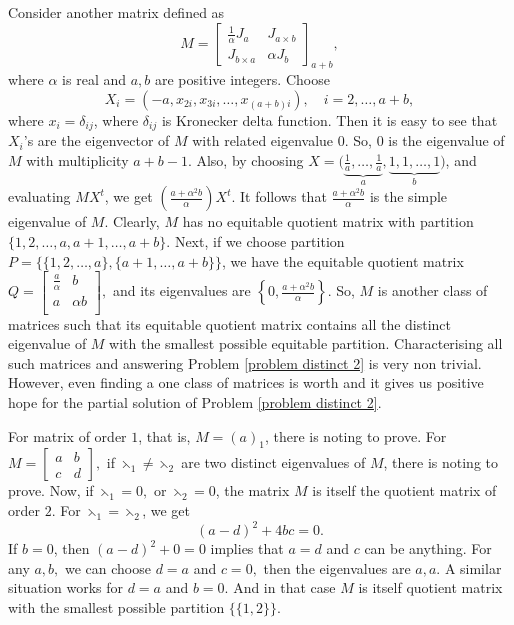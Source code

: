 \documentclass[12pt,twoside]{article}
\begin{document}
Consider another matrix defined as
$$M=\begin{bmatrix}
	\frac{1}{\alpha}J_{a} & J_{a\times b}\\
	J_{b\times a} & \alpha J_{b}
\end{bmatrix}_{a+b},$$ where $\alpha$ is real and $a,b$ are positive integers. Choose
$$X_{i}=(-a,x_{2i}, x_{3i},\dots,x_{(a+b)i}), \quad i=2,\dots,a+b,$$ where $x_{i}=\delta_{ij}$, where $ \delta_{ij}$ is Kronecker delta function. Then it is easy to see that $X_{i}$'s are the eigenvector of $M$ with related eigenvalue $0.$ So, $0$ is the eigenvalue of $M$ with multiplicity $a+b-1.$ Also, by choosing $X=\Big(\underbrace{\frac{1}{a},\dots,\frac{1}{a}}_{a},\underbrace{1,1,\dots,1}_{b}\Big)$, and evaluating $MX^{t}$, we get $\left(\frac{a+\alpha ^2 b}{\alpha }\right)X^{t}.$ It follows that $ \frac{a+\alpha ^2 b}{\alpha }$ is the simple eigenvalue of $M.$ Clearly, $M$ has no equitable quotient matrix with partition $\{1,2,\dots,a,a+1,\dots,a+b\}. $ Next, if we choose partition $P=\{\{1,2,\dots,a\},\{a+1,\dots,a+b\}\}$, we have the equitable quotient matrix $Q=\left[\begin{array}{cc}
	\frac{a}{\alpha } & b \\
	a & \alpha  b \\
\end{array}
\right],$ and its eigenvalues are $\left\{0,\frac{a+\alpha ^2 b}{\alpha }\right\}.$ So, $M$ is another class of matrices such that its equitable quotient matrix contains all the distinct eigenvalue of $M$ with the smallest possible equitable partition. Characterising all such matrices and answering Problem \ref{problem distinct 2} is very non trivial. However, even finding a one class of matrices is worth and it gives us positive hope for the partial solution of Problem \ref{problem distinct 2}.\vskip 2mm

For matrix of order $1$, that is, $M=(a)_{1}$, there is noting to prove. For $M=\begin{bmatrix}
	a & b\\
	c & d
\end{bmatrix},$ if $\leftthreetimes_{1}\neq \leftthreetimes_{2}$ are two distinct eigenvalues of $M$, there is noting to prove. Now, if $\leftthreetimes_{1} = 0, $ or $\leftthreetimes_{2}=0$, the matrix $M$ is itself the quotient matrix of order $2.$ For $\leftthreetimes_{1}=\leftthreetimes_{2}$, we get $$ (a-d)^{2}+4bc=0. $$
If $b = 0$, then $(a - d)^2 + 0 = 0  $ implies that $ a = d$ and $c$ can be anything.  For any $a, b,$ we can choose $d = a$ and $c = 0,$ 
then the eigenvalues are $a, a$. A similar situation works for $d=a$ and $b=0.$  And in that case $M$ is itself quotient matrix with the smallest possible partition $\{\{1,2\}\}$. 
\end{document}
